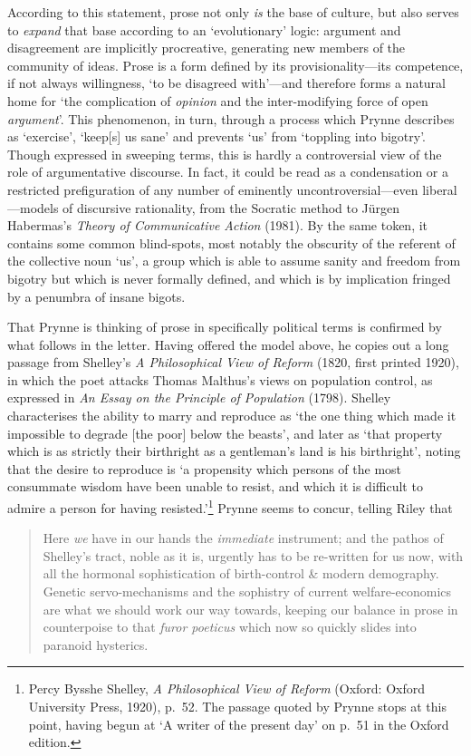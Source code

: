 \documentclass[]{article}
\begin{document}
\noindent According to this statement, prose not only \emph{is} the base
of culture, but also serves to \emph{expand} that base according to an
‘evolutionary’ logic: argument and disagreement are implicitly
procreative, generating new members of the community of ideas. Prose is
a form defined by its provisionality—its competence, if not always
willingness, ‘to be disagreed with’—and therefore forms a natural home
for ‘the complication of \emph{opinion} and the inter-modifying force of
open \emph{argument}’. This phenomenon, in turn, through a process which
Prynne describes as ‘exercise’, ‘keep{[}s{]} us sane’ and prevents ‘us’
from ‘toppling into bigotry’. Though expressed in sweeping terms, this
is hardly a controversial view of the role of argumentative discourse.
In fact, it could be read as a condensation or a restricted
prefiguration of any number of eminently uncontroversial—even
liberal—models of discursive rationality, from the Socratic method to
Jürgen Habermas’s \emph{Theory of Communicative Action} (1981). By the
same token, it contains some common blind-spots, most notably the
obscurity of the referent of the collective noun ‘us’, a group which is
able to assume sanity and freedom from bigotry but which is never
formally defined, and which is by implication fringed by a penumbra of
insane bigots.

That Prynne is thinking of prose in specifically political terms is
confirmed by what follows in the letter. Having offered the model above,
he copies out a long passage from Shelley’s \emph{A Philosophical View
of Reform} (1820, first printed 1920), in which the poet attacks Thomas
Malthus’s views on population control, as expressed in \emph{An Essay on
the Principle of Population} (1798). Shelley characterises the ability
to marry and reproduce as ‘the one thing which made it impossible to
degrade {[}the poor{]} below the beasts’, and later as ‘that property
which is as strictly their birthright as a gentleman’s land is his
birthright’, noting that the desire to reproduce is ‘a propensity which
persons of the most consummate wisdom have been unable to resist, and
which it is difficult to admire a person for having resisted.’\footnote{Percy
  Bysshe Shelley, \emph{A Philosophical View of Reform} (Oxford: Oxford
  University Press, 1920), p.~52. The passage quoted by Prynne stops at
  this point, having begun at ‘A writer of the present day’ on p.~51 in
  the Oxford edition.} Prynne seems to concur, telling Riley that

\begin{quote}
\singlespacing Here \emph{we} have in our hands the \emph{immediate}
instrument; and the pathos of Shelley’s tract, noble as it is, urgently
has to be re-written for us now, with all the hormonal sophistication of
birth-control \& modern demography. Genetic servo-mechanisms and the
sophistry of current welfare-economics are what we should work our way
towards, keeping our balance in prose in counterpoise to that
\emph{furor poeticus} which now so quickly slides into paranoid
hysterics.
\end{quote}
\end{document}
